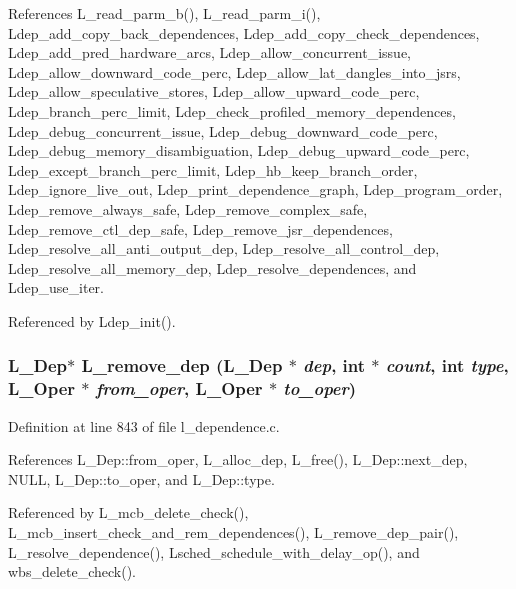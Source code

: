 References L\_\-read\_\-parm\_\-b(), L\_\-read\_\-parm\_\-i(), Ldep\_\-add\_\-copy\_\-back\_\-dependences, Ldep\_\-add\_\-copy\_\-check\_\-dependences, Ldep\_\-add\_\-pred\_\-hardware\_\-arcs, Ldep\_\-allow\_\-concurrent\_\-issue, Ldep\_\-allow\_\-downward\_\-code\_\-perc, Ldep\_\-allow\_\-lat\_\-dangles\_\-into\_\-jsrs, Ldep\_\-allow\_\-speculative\_\-stores, Ldep\_\-allow\_\-upward\_\-code\_\-perc, Ldep\_\-branch\_\-perc\_\-limit, Ldep\_\-check\_\-profiled\_\-memory\_\-dependences, Ldep\_\-debug\_\-concurrent\_\-issue, Ldep\_\-debug\_\-downward\_\-code\_\-perc, Ldep\_\-debug\_\-memory\_\-disambiguation, Ldep\_\-debug\_\-upward\_\-code\_\-perc, Ldep\_\-except\_\-branch\_\-perc\_\-limit, Ldep\_\-hb\_\-keep\_\-branch\_\-order, Ldep\_\-ignore\_\-live\_\-out, Ldep\_\-print\_\-dependence\_\-graph, Ldep\_\-program\_\-order, Ldep\_\-remove\_\-always\_\-safe, Ldep\_\-remove\_\-complex\_\-safe, Ldep\_\-remove\_\-ctl\_\-dep\_\-safe, Ldep\_\-remove\_\-jsr\_\-dependences, Ldep\_\-resolve\_\-all\_\-anti\_\-output\_\-dep, Ldep\_\-resolve\_\-all\_\-control\_\-dep, Ldep\_\-resolve\_\-all\_\-memory\_\-dep, Ldep\_\-resolve\_\-dependences, and Ldep\_\-use\_\-iter.

Referenced by Ldep\_\-init().
\subsubsection{\setlength{\rightskip}{0pt plus 5cm}\bf{L\_\-Dep}$\ast$ L\_\-remove\_\-dep (\bf{L\_\-Dep} $\ast$ {\em dep}, int $\ast$ {\em count}, int {\em type}, L\_\-Oper $\ast$ {\em from\_\-oper}, L\_\-Oper $\ast$ {\em to\_\-oper})}\label{l__dependence_8c_64456aa8e72a2caac9f3f45b002c89f8}




Definition at line 843 of file l\_\-dependence.c.

References L\_\-Dep::from\_\-oper, L\_\-alloc\_\-dep, L\_\-free(), L\_\-Dep::next\_\-dep, NULL, L\_\-Dep::to\_\-oper, and L\_\-Dep::type.

Referenced by L\_\-mcb\_\-delete\_\-check(), L\_\-mcb\_\-insert\_\-check\_\-and\_\-rem\_\-dependences(), L\_\-remove\_\-dep\_\-pair(), L\_\-resolve\_\-dependence(), Lsched\_\-schedule\_\-with\_\-delay\_\-op(), and wbs\_\-delete\_\-check().
